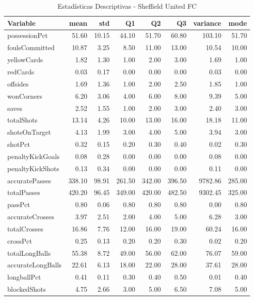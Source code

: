 \begin{table}[H]
\centering
\caption{Estadísticas Descriptivas - Sheffield United FC}
\label{tab:eng_sheff_utd}
\small
\begin{tabular}{lrrrrrrr}
\hline
Variable & mean & std & Q1 & Q2 & Q3 & variance & mode \\
\hline
possessionPct & 51.60 & 10.15 & 44.10 & 51.70 & 60.80 & 103.10 & 51.70 \\
foulsCommitted & 10.87 & 3.25 & 8.50 & 11.00 & 13.00 & 10.54 & 10.00 \\
yellowCards & 1.82 & 1.30 & 1.00 & 2.00 & 3.00 & 1.69 & 1.00 \\
redCards & 0.03 & 0.17 & 0.00 & 0.00 & 0.00 & 0.03 & 0.00 \\
offsides & 1.69 & 1.36 & 1.00 & 2.00 & 2.50 & 1.85 & 1.00 \\
wonCorners & 6.20 & 3.06 & 4.00 & 6.00 & 8.00 & 9.39 & 5.00 \\
saves & 2.52 & 1.55 & 1.00 & 2.00 & 3.00 & 2.40 & 3.00 \\
totalShots & 13.14 & 4.26 & 10.00 & 13.00 & 16.00 & 18.18 & 11.00 \\
shotsOnTarget & 4.13 & 1.99 & 3.00 & 4.00 & 5.00 & 3.94 & 3.00 \\
shotPct & 0.32 & 0.15 & 0.20 & 0.30 & 0.40 & 0.02 & 0.30 \\
penaltyKickGoals & 0.08 & 0.28 & 0.00 & 0.00 & 0.00 & 0.08 & 0.00 \\
penaltyKickShots & 0.13 & 0.34 & 0.00 & 0.00 & 0.00 & 0.11 & 0.00 \\
accuratePasses & 338.10 & 98.91 & 261.50 & 342.00 & 396.50 & 9782.86 & 285.00 \\
totalPasses & 420.20 & 96.45 & 349.00 & 420.00 & 482.50 & 9302.45 & 325.00 \\
passPct & 0.80 & 0.06 & 0.80 & 0.80 & 0.80 & 0.00 & 0.80 \\
accurateCrosses & 3.97 & 2.51 & 2.00 & 4.00 & 5.00 & 6.28 & 3.00 \\
totalCrosses & 16.86 & 7.76 & 12.00 & 16.00 & 19.00 & 60.24 & 16.00 \\
crossPct & 0.25 & 0.13 & 0.20 & 0.20 & 0.30 & 0.02 & 0.20 \\
totalLongBalls & 55.38 & 8.72 & 49.00 & 56.00 & 62.00 & 76.07 & 59.00 \\
accurateLongBalls & 22.61 & 6.13 & 18.00 & 22.00 & 28.00 & 37.61 & 28.00 \\
longballPct & 0.41 & 0.11 & 0.30 & 0.40 & 0.50 & 0.01 & 0.40 \\
blockedShots & 4.75 & 2.66 & 3.00 & 5.00 & 6.50 & 7.08 & 5.00 \\

\end{tabular}
\end{table}
